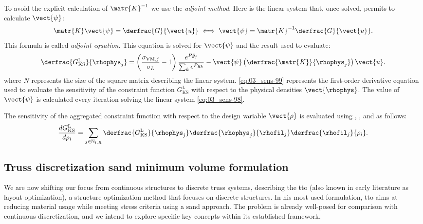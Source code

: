 To avoid the explicit calculation of $\matr{K}^{-1}$ we use the \textit{adjoint method}. Here is the linear system that, once solved, permits to calculate $\vect{\psi}$:
\begin{equation} \label{eq:03_sens-98}
    \matr{K}\vect{\psi} = \derfrac{G}{\vect{u}} \iff \vect{\psi} = \matr{K}^{-1}\derfrac{G}{\vect{u}}.
\end{equation}
This formula is called \textit{adjoint equation}. This equation is solved for $\vect{\psi}$ and the result used to evaluate:
\begin{equation}\label{eq:03_sens-99}
\derfrac{G_{\text{KS}}^\text{L}}{\rhophys_j} = \left(\frac{ \sigma_{\text{VM},j}}{\sigma_L}-1 \right) \frac{e^{{P}\bar{g}_j}}{\sum_k e^{{P}\bar{g}_k}} - \vect{\psi} \left(\derfrac{\matr{K}}{\rhophys_{j}}\right) \vect{u}.
\end{equation}
 where $N$ represents the size of the square matrix describing the linear system.
\eqref{eq:03_sens-99} represents the first-order derivative equation used to evaluate the sensitivity of the constraint function $G_{\text{KS}}^\text{L}$ with respect to the physical densities $\vect{\rhophys}$. The value of $\vect{\psi}$ is calculated every iteration solving the linear system \ref{eq:03_sens-98}.

The sensitivity of the aggregated constraint function with respect to the design variable $\vect{\rho}$ is evaluated using  , , and  as follows:
\begin{equation} \label{eq:03_chain_sens_fin}
    \frac{d G_{\text{KS}}^\text{L}}{d \rho_i} = \sum_{j \in \mathbb{N}_{i,R}} \derfrac{G_{\text{KS}}^\text{L}}{\rhophys_j} \derfrac{\rhophys_j}{\rhofil_j} \derfrac{\rhofil_j}{\rho_i}.
\end{equation}

\subsection{Truss discretization \gls{sand} minimum volume formulation}
We are now shifting our focus from continuous structures to discrete truss systems, describing the \acrfull{tto} (also known in early literature as layout optimization), a structure optimization method that focuses on discrete structures. In his most used formulation, \gls{tto} aims at reducing material usage while meeting stress criteria using a \gls{sand} approach. The problem is already well-posed for comparison with continuous discretization, and we intend to explore specific key concepts within its established framework.

